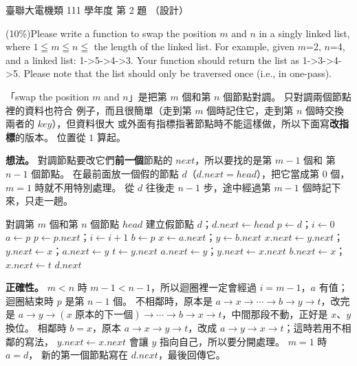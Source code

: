 \begin{pastexam}[label={px:ust-111-ee-ds-02}]{臺聯大電機類 111 學年度 第 2 題}
（設計）

(10\%)Please write a function to swap the position $m$ and $n$ in a singly linked list, where
$1 \leqq m \leqq n \leqq$ the length of the linked list. For example, given $m$=2, $n$=4, and a
linked list: 1->5->4->3. Your function should return the list as 1->3->4->5. Please note that the list
should only be traversed once (i.e., in one-pass).
\end{pastexam}

\begin{pastsoln}
「swap the position $m$ and $n$」是把第 $m$ 個和第 $n$ 個節點對調。 只對調兩個節點裡的資料也符合
例子，而且很簡單（走到第 $m$ 個時記住它，走到第 $n$ 個時交換兩者的 $\mathit{key}$），但資料很大
或外面有指標指著節點時不能這樣做，所以下面寫\textbf{改指標}的版本。 位置從 $1$ 算起。

\textbf{想法。} 對調節點要改它們\textbf{前一個}節點的 $\mathit{next}$，所以要找的是第 $m - 1$ 個和
第 $n - 1$ 個節點。 在最前面放一個假的節點 $d$（$d.\mathit{next} = \mathit{head}$），把它當成第 $0$
個，$m = 1$ 時就不用特別處理。 從 $d$ 往後走 $n - 1$ 步，途中經過第 $m - 1$ 個時記下來，只走一趟。

\begin{pseudo}{對調第 $m$ 個和第 $n$ 個節點}
        \State \Return $\mathit{head}$
    \EndIf
    \State 建立假節點 $d$；$d.\mathit{next} \gets \mathit{head}$
    \State $p \gets d$；$i \gets 0$ 
            \State $a \gets p$ 
        \EndIf
        \State $p \gets p.\mathit{next}$；$i \gets i + 1$
    \EndWhile
    \State $b \gets p$ 
    \State $x \gets a.\mathit{next}$；$y \gets b.\mathit{next}$ 
     
        \State $x.\mathit{next} \gets y.\mathit{next}$；$y.\mathit{next} \gets x$；$a.\mathit{next} \gets y$
    \Else
        \State $t \gets y.\mathit{next}$
        \State $a.\mathit{next} \gets y$；$y.\mathit{next} \gets x.\mathit{next}$
        \State $b.\mathit{next} \gets x$；$x.\mathit{next} \gets t$
    \EndIf
    \State \Return $d.\mathit{next}$
\EndFunction
\end{pseudo}

\textbf{正確性。} $m < n$ 時 $m - 1 < n - 1$，所以迴圈裡一定會經過 $i = m - 1$，$a$ 有值；迴圈結束時
$p$ 是第 $n - 1$ 個。 不相鄰時，原本是 $a \to x \to \cdots \to b \to y \to t$，改完是
$a \to y \to (x \text{ 原本的下一個}) \to \cdots \to b \to x \to t$，中間那段不動，正好是 $x$、$y$ 換位。
相鄰時 $b = x$，原本 $a \to x \to y \to t$，改成 $a \to y \to x \to t$；這時若用不相鄰的寫法，
$y.\mathit{next} \gets x.\mathit{next}$ 會讓 $y$ 指向自己，所以要分開處理。 $m = 1$ 時 $a = d$，
新的第一個節點寫在 $d.\mathit{next}$，最後回傳它。


\end{pastsoln}
